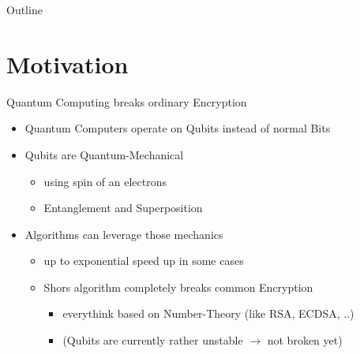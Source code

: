 \documentclass[ucs,10pt]{beamer}
\begin{document}
\begin{frame}[plain]
  \titlepage
\end{frame}

\begin{frame}{Outline}
  \tableofcontents[pausesections]
\end{frame}


\section{Motivation}

\begin{frame}{Quantum Computing breaks ordinary Encryption}
  \begin{itemize}
  \item
    Quantum Computers operate on Qubits instead of normal Bits
  \item
    Qubits are Quantum-Mechanical
    \begin{itemize}
      \item using spin of an electrons
      \item Entanglement and Superposition
    \end{itemize}
  \item
    Algorithms can leverage those mechanics
    \begin{itemize}
      \item up to exponential speed up in some cases
      \item Shors algorithm completely breaks common Encryption 
      \begin{itemize}
        \item everythink based on Number-Theory (like RSA, ECDSA, ..)
        \item (Qubits are currently rather unstable $\rightarrow$ not broken yet)
      \end{itemize}
    \end{itemize}
  \end{itemize}
\end{frame}
\end{document}
